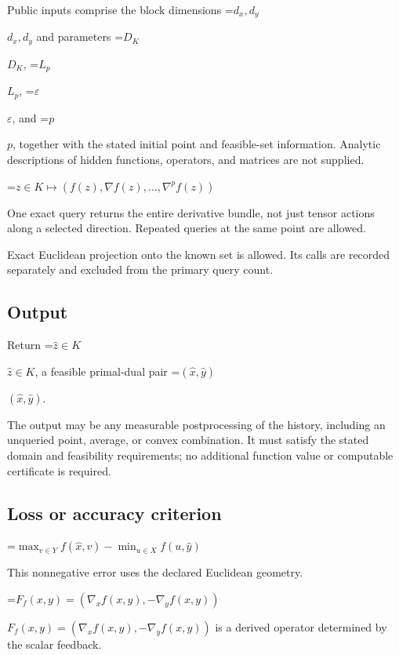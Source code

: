 \documentclass[10pt,a4paper]{article}
\newcommand{\AtlasMath}[1]{\par\begingroup\centering\setbox0=\hbox{$\displaystyle #1$}\ifdim\wd0>1.4\linewidth\typeout{ATLAS WIDE FORMULA: \the\wd0}\fi\ifdim\wd0>\linewidth\resizebox{\linewidth}{!}{\box0}\else\box0\fi\par\endgroup}
\newcommand{\AtlasInlineMath}[1]{\begingroup\setbox0=\hbox{$#1$}\ifdim\wd0>.4\linewidth\endgroup\AtlasMath{#1}\else\endgroup$#1$\fi}
\begin{document}
Public inputs comprise the block dimensions \AtlasInlineMath{d_x,d_y} and parameters \AtlasInlineMath{D_K}, \AtlasInlineMath{L_p}, \AtlasInlineMath{\varepsilon}, and \AtlasInlineMath{p}, together with the stated initial point and feasible-set information. Analytic descriptions of hidden functions, operators, and matrices are not supplied.




\AtlasMath{z\in K\longmapsto(f(z),\nabla f(z),\ldots,\nabla^p f(z))}




One exact query returns the entire derivative bundle, not just tensor actions along a selected direction. Repeated queries at the same point are allowed.



Exact Euclidean projection onto the known set is allowed. Its calls are recorded separately and excluded from the primary query count.



\subsection{Output}


Return \AtlasInlineMath{\widehat{z}\in K}, a feasible primal-dual pair \AtlasInlineMath{(\widehat{x},\widehat{y})}.



The output may be any measurable postprocessing of the history, including an unqueried point, average, or convex combination. It must satisfy the stated domain and feasibility requirements; no additional function value or computable certificate is required.



\subsection{Loss or accuracy criterion}



\AtlasMath{\max_{v\in Y}f(\widehat{x},v)-\min_{u\in X}f(u,\widehat{y})}




This nonnegative error uses the declared Euclidean geometry.



\AtlasInlineMath{F_f(x,y)=(\nabla_xf(x,y),-\nabla_yf(x,y))} is a derived operator determined by the scalar feedback.
\end{document}
